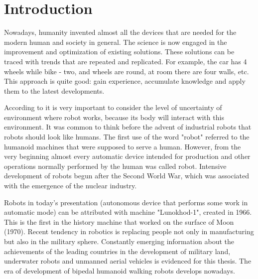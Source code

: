 \documentclass[11pt,a4paper]{article}
\begin{document}
\newpage

\section{Introduction}
Nowadays, humanity invented almost all the devices that are needed for the modern human and society in general. The science is now engaged in the improvement and optimization of existing solutions. These solutions can be traced with trends that are repeated and replicated. For example, the car has 4 wheels while bike - two, and wheels are round, at room there are four walls, etc. This approach is quite good: gain experience, accumulate knowledge and apply them to the latest developments.

According to \cite{pfeifer2007self} it is very important to consider the level of uncertainty of environment where robot works, because its body will interact with this environment. It was common to think before the advent of industrial robots that robots should look like humans. The first use of the word "robot" referred to the humanoid machines that were supposed to serve a human. However, from the very beginning almost every automatic device intended for production and other operations normally performed by the human was called robot. Intensive development of robots begun after the Second World War, which was associated with the emergence of the nuclear industry.

Robots in today's presentation (autonomous device that performs some work in automatic mode) can be attributed with machine "Lunokhod-1", created in 1966. This is the first in the history machine that worked on the surface of Moon (1970). Recent tendency in robotics is replacing people not only in manufacturing but also in the military sphere. Constantly emerging information about the achievements of the leading countries in the development of military land, underwater robots and unmanned aerial vehicles is evidenced for this thesis. The era of development of  bipedal humanoid walking robots develops nowadays.
\end{document}
